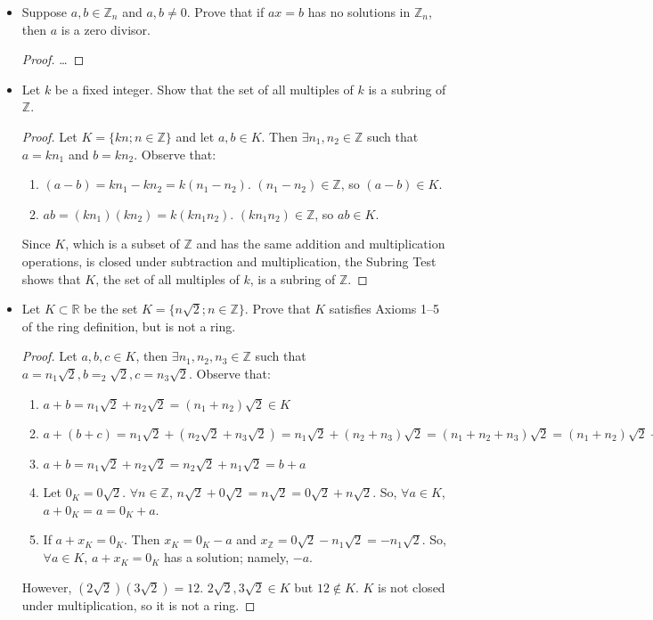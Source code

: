 \documentclass[12pt]{article}
\newcommand{\zee}{\mathbb{Z}}
\begin{document}
\begin{itemize}
\item[\textbf{2.3.16.}] Suppose $a,b\in\zee_n$ and $a,b\ne0$. Prove that if $ax=b$ has no solutions in $\zee_n$, then $a$ is a zero divisor.

\begin{proof}
\dots
\end{proof}

\item[\textbf{3.1.6b.}] Let $k$ be a fixed integer. Show that the set of all multiples of $k$ is a subring of $\zee$.

\begin{proof}
Let $K = \{k n; n \in \zee \}$ and let $a, b \in K$.
Then $\exists n_1, n_2 \in \zee$ such that $a=kn_1$ and $b=kn_2$.
Observe that:
\begin{enumerate}
  \item $(a-b) = k n_1 - k n_2 = k (n_1 - n_2)$. $(n_1 - n_2) \in \zee$, so $(a-b) \in K$.
  \item $ab = (k n_1)(k n_2) = k(k n_1 n_2)$. $(k n_1 n_2) \in \zee$, so $ab \in K$.
\end{enumerate}
Since $K$, which is a subset of $\zee$ and has the same addition and multiplication operations, is closed under subtraction and multiplication, the Subring Test shows that $K$, the set of all multiples of $k$, is a subring of $\zee$.
\end{proof}

\item[\textbf{3.1.7.}] Let $K\subset \mathbb{R}$ be the set $K=\{n\sqrt{2}; n\in\zee \}$. Prove that $K$ satisfies Axioms 1--5 of the ring definition, but is not a ring.

\begin{proof}
Let $a,b,c \in K$, then $\exists n_1, n_2, n_3 \in \zee$ such that $a=n_1\sqrt{2}, b=_2\sqrt{2}, c=n_3\sqrt{2}$.
Observe that:
\begin{enumerate}
  \item $a+b = n_1\sqrt{2} + n_2\sqrt{2} = (n_1 + n_2)\sqrt{2} \in K$
  \item $a+(b+c) = n_1\sqrt{2} + (n_2\sqrt{2} + n_3\sqrt{2}) = n_1\sqrt{2} + (n_2 + n_3)\sqrt{2} = (n_1 + n_2 + n_3)\sqrt{2} =
  (n_1 + n_2)\sqrt{2} + n_3\sqrt{2} = (n_1\sqrt{2} + n_2\sqrt{2}) + n_3\sqrt{2} = (a+b)+c$
  \item $a+b = n_1\sqrt{2} + n_2\sqrt{2} = n_2\sqrt{2} + n_1\sqrt{2} = b+a$
  \item Let $0_K = 0\sqrt{2}$. $\forall n \in \zee$, $n\sqrt{2} + 0\sqrt{2} = n\sqrt{2} = 0\sqrt{2} + n\sqrt{2}$. So, $\forall a \in K$, $a+0_K = a = 0_K + a$.
  \item If $a + x_K = 0_K$. Then $x_K = 0_K - a$ and $x_\zee = 0\sqrt{2} - n_1 \sqrt{2} = -n_1\sqrt{2}$. So, $\forall a \in K$, $a + x_K = 0_K$ has a solution; namely, $-a$.
\end{enumerate}
However, $(2 \sqrt{2}) (3 \sqrt{2}) = 12$.
$2 \sqrt{2}, 3 \sqrt{2} \in K$ but $12 \not\in K$.
$K$ is not closed under multiplication, so it is not a ring.
\end{proof}


\end{itemize}
\end{document}
